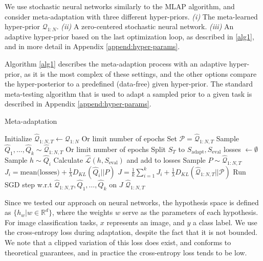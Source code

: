 \documentclass{article} %
\theoremstyle{definition}
\begin{document}
We use stochastic neural networks \citep{Graves2011, Blundell2015} similarly to the MLAP \citep{Amit2018} algorithm, and consider meta-adaptation with three different hyper-priors. \emph{(i)} The meta-learned hyper-prior $\mathcal{Q}_{1:N}$. \emph{(ii)} A zero-centered stochastic neural network. \emph{(iii)}  An adaptive hyper-prior based on the last optimization loop, as described in \ref{alg1}, and in more detail in  Appendix \ref{append:hyper-params}. 

Algorithm \ref{alg1} describes the meta-adaption process with an adaptive hyper-prior, as it is the most complex of these settings, and the other options compare the hyper-posterior to a predefined (data-free) given hyper-prior. The standard meta-testing algorithm that is used to adapt a sampled prior to a given task is described in Appendix \ref{append:hyper-params}.

\begin{algorithm}[H]
	\caption{Meta-adaptation}
	\label{alg1}
	\small
	\begin{algorithmic}
		\State Initialize $\hat{\mathcal{Q}}_{1:N, T}\leftarrow \mathcal{Q}_{1:N}$
		 \Comment Or limit number of epochs
			\State Set $\mathcal{P}=\hat{\mathcal{Q}}_{1:N, T}$
			\State Sample $\hat{Q}_1,\ldots,\hat{Q}_k\sim \hat{\mathcal{Q}}_{1:N, T}$
			 \Comment Or limit number of epochs
					\State Split $S_T$ to $S_{\mathrm{adapt}},S_{\mathrm{eval}}$
					\State losses $\leftarrow \emptyset$
						\State Sample $h\sim \hat{Q}_i$
						\State Calculate $\hat{\mathcal{L}}(h,S_{\mathrm{eval}})$ and add to losses
					\EndFor 
					\State Sample $P\sim \hat{\mathcal{Q}}_{1:N, T}$
					\State $J_i=\textrm{mean(losses)}+\frac{1}{\lambda} D_{KL}(\hat{Q}_i||P)$
				\EndFor
				\State $J=\frac{1}{k}\sum_{i=1}^{k}J_i + \frac{1}{\lambda} D_{KL}(\hat{\mathcal{Q}}_{1:N, T}||\mathcal{P})$
				\State  Run SGD step w.r.t $\hat{\mathcal{Q}}_{1:N, T},\hat{Q}_1,\ldots,\hat{Q}_k$ on $J$
			\EndWhile
		\EndWhile
		\State \Return $\hat{\mathcal{Q}}_{1:N, T}$
		\EndFunction
	\end{algorithmic}
\end{algorithm}

Since we tested our approach on neural networks, the hypothesis space is defined as $\{h_w|w\in \mathbb{R}^d\}$, where the weights $w$ serve as the parameters of each hypothesis.
For image classification tasks, $x$ represents an image, and $y$ a class label. 
We use the cross-entropy loss during adaptation, despite the fact that it is not bounded. We note that a clipped variation of this loss does exist, and conforms to theoretical guarantees, and in practice the cross-entropy loss tends to be low.
\end{document}
